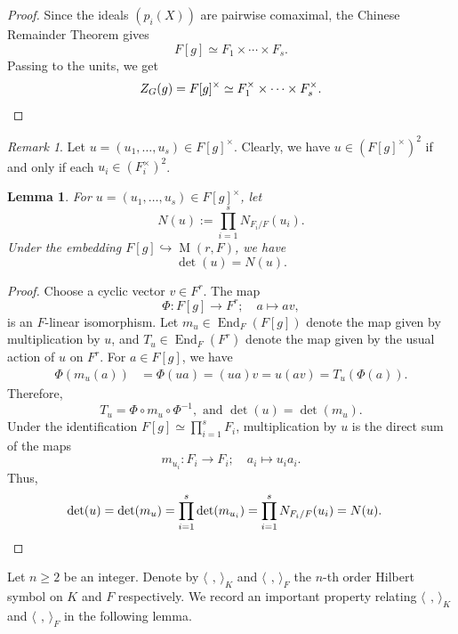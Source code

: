\documentclass[11pt, a4paper, reqno]{amsart}
\newtheorem{lemma}[theorem]{Lemma}
\theoremstyle{definition}
\theoremstyle{remark}
\newtheorem{remark}[theorem]{Remark}
\theoremstyle{example}
\theoremstyle{note}
\numberwithin{equation}{section}
\DeclareMathOperator{\M}{M}
\DeclareMathOperator{\End}{End}
\begin{document}
\begin{proof} Since the ideals $(p_i(X))$ are pairwise comaximal, the Chinese Remainder
Theorem gives
\[
F[g]\simeq F_{1} \times \cdots \times F_{s}. %
\]
Passing to the units, we get
\[
Z_{G}(g)=F[g]^{\times}\simeq F_{1}^{\times} \times \cdots \times F_{s}^{\times}. \qedhere
\]
\end{proof}

\begin{remark} Let  $u = (u_{1},\ldots ,u_{s}) \in F[g]^\times.$ Clearly, we have $u\in (F[g]^{\times})^{2}$ if and only if each
$u_{i} \in (F_{i}^{\times})^{2}$.
\end{remark}



\begin{lemma}\label{lem:det-equals-norm} For $u=(u_{1}, \ldots, u_{s})\in F[g]^{\times}$, let \begin{equation*}\label{definition of N(u)}N(u):=\prod_{i=1}^{s} N_{F_{i}/F}(u_{i}).\end{equation*}
Under the embedding $F[g]\hookrightarrow \M(r,F)$, we have
\[
\det(u)=N(u).
\]
\end{lemma}

\begin{proof} Choose a cyclic vector $v\in F^{r}$. The map
\[
\Phi:F[g]\longrightarrow F^{r}; \quad a\longmapsto av,
\]
is an $F$-linear isomorphism. Let $m_{u}\in \End_{F}(F[g])$ denote the map given by multiplication by $u$, and $T_u\in \End_{F}(F^{r})$ denote the map given by the usual action of $u$ on $F^{r}.$ For $a\in F[g]$, we have
\begin{align*}
\Phi(m_u(a))
&=\Phi(ua)=(ua)v=u(av)=T_u(\Phi(a)).
\end{align*}
Therefore, 
\begin{equation*}
T_u=\Phi\circ m_u\circ\Phi^{-1}, \textrm{ and } \det(u) = \det(m_u).
\end{equation*}
Under the identification $\displaystyle F[g]\simeq  \prod\limits_{i=1}^{s} F_{i} $, multiplication by $u$ is the direct sum of the maps
\[
m_{u_i}:F_{i}\longrightarrow F_{i}; \quad a_{i}\longmapsto u_{i}a_{i}.
\]
Thus,
\begin{align*}
\det(u) &=  \det(m_u)=\prod_{i=1}^s {\det}(m_{u_i})=\prod_{i=1}^s N_{F_i/F}(u_i)=N(u). \qedhere
\end{align*}
\end{proof}

Let $n\geq 2$ be an integer. Denote by 
$\langle \, \  , \,  \rangle_{K}$ and $\langle \, \  , \,  \rangle_{F}$ the $n$-th order Hilbert symbol on $K$ and $F$ respectively. We record an important property relating $\langle \, \  , \,  \rangle_{K}$ and $\langle \, \  , \,  \rangle_{F}$ in the following lemma. 
\end{document}
